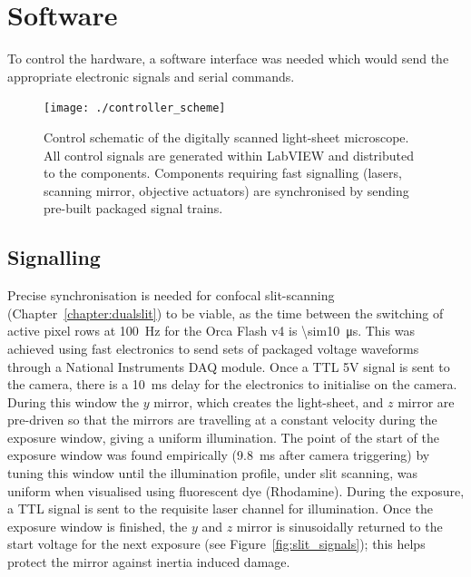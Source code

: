 \section{Software}

To control the hardware, a software interface was needed which would send the appropriate electronic signals and serial commands.

\begin{figure}
    \centering
  \texttt{[image: ./controller\_scheme]} %
  \caption{Control schematic of the digitally scanned light-sheet microscope.
  All control signals are generated within LabVIEW and distributed to the components.
  Components requiring fast signalling (lasers, scanning mirror, objective actuators) are synchronised by sending pre-built packaged signal trains.}\label{fig:control}
\end{figure}



\subsection{Signalling} %

Precise synchronisation is needed for confocal slit-scanning (Chapter~\ref{chapter:dualslit}) to be viable, as the time between the switching of active pixel rows at \SI{100}{\hertz} for the Orca Flash v4 is \SI{\sim10}{\micro\second}. %
This was achieved using fast electronics to send sets of packaged voltage waveforms through a National Instruments DAQ module.
Once a TTL 5V signal is sent to the camera, there is a \SI{10}{\milli\second} delay for the electronics to initialise on the camera.
During this window the \(y\) mirror, which creates the light-sheet, and \(z\) mirror are pre-driven so that the mirrors are travelling at a constant velocity during the exposure window, giving a uniform illumination.
The point of the start of the exposure window was found empirically (\SI{9.8}{\milli\second} after camera triggering) by tuning this window until the illumination profile, under slit scanning, was uniform when visualised using fluorescent dye (Rhodamine).
During the exposure, a TTL signal is sent to the requisite laser channel for illumination.
Once the exposure window is finished, the \(y\) and \(z\) mirror is sinusoidally returned to the start voltage for the next exposure (see Figure~\ref{fig:slit_signals}); this helps protect the mirror against inertia induced damage.

